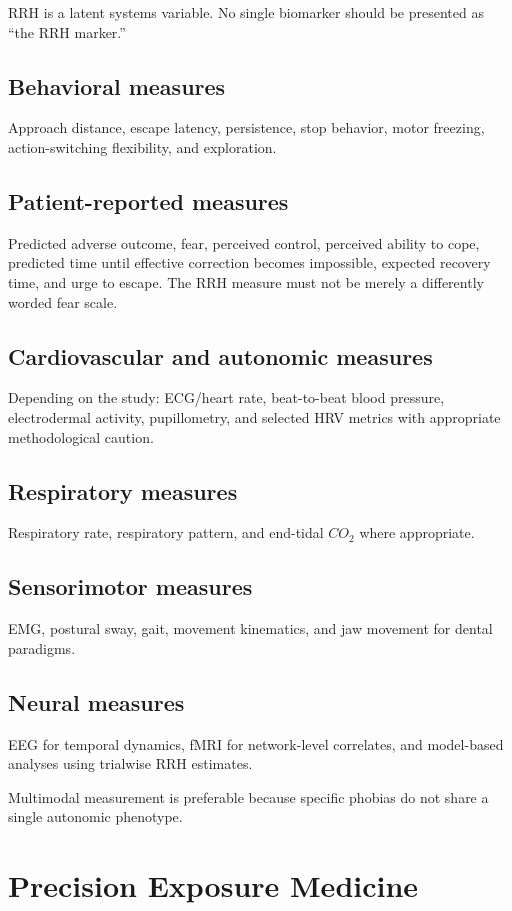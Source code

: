 \documentclass[11pt]{article}
\begin{document}
RRH is a latent systems variable. No single biomarker should be presented as ``the RRH marker.''

\subsection{Behavioral measures}
Approach distance, escape latency, persistence, stop behavior, motor freezing, action-switching flexibility, and exploration.

\subsection{Patient-reported measures}
Predicted adverse outcome, fear, perceived control, perceived ability to cope, predicted time until effective correction becomes impossible, expected recovery time, and urge to escape. The RRH measure must not be merely a differently worded fear scale.

\subsection{Cardiovascular and autonomic measures}
Depending on the study: ECG/heart rate, beat-to-beat blood pressure, electrodermal activity, pupillometry, and selected HRV metrics with appropriate methodological caution.

\subsection{Respiratory measures}
Respiratory rate, respiratory pattern, and end-tidal $CO_2$ where appropriate.

\subsection{Sensorimotor measures}
EMG, postural sway, gait, movement kinematics, and jaw movement for dental paradigms.

\subsection{Neural measures}
EEG for temporal dynamics, fMRI for network-level correlates, and model-based analyses using trialwise RRH estimates.

Multimodal measurement is preferable because specific phobias do not share a single autonomic phenotype.

\section{Precision Exposure Medicine}
\end{document}
